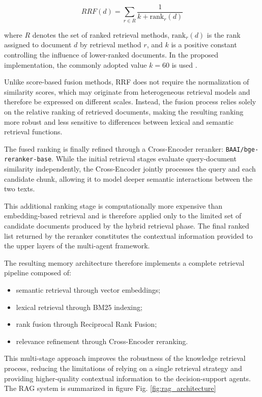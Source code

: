 \begin{equation}
RRF(d)=\sum_{r\in R}\frac{1}{k+\mathrm{rank}_r(d)}
\label{eq:rrf}
\end{equation}

where \(R\) denotes the set of ranked retrieval methods, \(\mathrm{rank}_r(d)\) is the rank assigned to document \(d\) by retrieval method \(r\), and \(k\) is a positive constant controlling the influence of lower-ranked documents. In the proposed implementation, the commonly adopted value \(k=60\) is used \cite{cormack2009reciprocal}.

Unlike score-based fusion methods, RRF does not require the normalization of similarity scores, which may originate from heterogeneous retrieval models and therefore be expressed on different scales. Instead, the fusion process relies solely on the relative ranking of retrieved documents, making the resulting ranking more robust and less sensitive to differences between lexical and semantic retrieval functions.

The fused ranking is finally refined through a Cross-Encoder reranker: \texttt{BAAI/bge-reranker-base}. While the initial retrieval stages evaluate query-document similarity independently, the Cross-Encoder jointly processes the query and each candidate chunk, allowing it to model deeper semantic interactions between the two texts.

This additional ranking stage is computationally more expensive than embedding-based retrieval and is therefore applied only to the limited set of candidate documents produced by the hybrid retrieval phase. The final ranked list returned by the reranker constitutes the contextual information provided to the upper layers of the multi-agent framework.

The resulting memory architecture therefore implements a complete retrieval pipeline composed of:

\begin{itemize}
    \item semantic retrieval through vector embeddings;
    \item lexical retrieval through BM25 indexing;
    \item rank fusion through Reciprocal Rank Fusion;
    \item relevance refinement through Cross-Encoder reranking.
\end{itemize}

This multi-stage approach improves the robustness of the knowledge retrieval process, reducing the limitations of relying on a single retrieval strategy and providing higher-quality contextual information to the decision-support agents. The RAG system is summarized in figure Fig. \ref{fig:rag_architecture}


